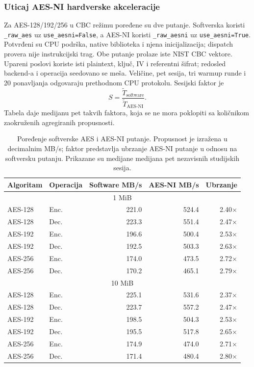 \subsubsection{Uticaj AES-NI hardverske akceleracije}
\label{sec:aesni}
\label{sec:aes-akceleracija}
\label{sec:rezultati-aesni}
Za AES-128/192/256 u CBC režimu poređene su dve putanje.
Softverska koristi \texttt{\_raw\_aes} uz \texttt{use\_\allowbreak aesni=False},
a AES-NI koristi \texttt{\_raw\_aesni} uz \texttt{use\_\allowbreak aesni=True}.
Potvrđeni su CPU podrška, native biblioteka
i njena inicijalizacija; dispatch provera nije instrukcijski trag.
Obe putanje prolaze iste NIST CBC vektore. Upareni poslovi koriste isti
plaintext, ključ, IV i referentni šifrat; redosled backend-a i operacija
seedovano se meša. Veličine, pet sesija, tri warmup runde i 20 ponavljanja
odgovaraju prethodnom CPU protokolu. Sesijski faktor je
\begin{equation}
S = \frac{\widetilde{T}_{\mathrm{software}}}
         {\widetilde{T}_{\mathrm{AES\mbox{-}NI}}}.
\label{eq:aesni-ubrzanje}
\end{equation}
Tabela daje medijanu pet takvih faktora, koja se ne mora poklopiti sa
količnikom zaokruženih agregiranih propusnosti.

\begin{table}[htbp]
\centering
\caption{Poređenje softverske AES i AES-NI putanje. Propusnost je izražena
u decimalnim MB/s; faktor predstavlja ubrzanje AES-NI putanje u odnosu na
softversku putanju. Prikazane su medijane medijana pet nezavisnih studijskih
sesija.}
\label{tab:aesni-rezultati}
\begin{tabular}{llrrr}
\toprule
Algoritam & Operacija &
Software MB/s & AES-NI MB/s & Ubrzanje \\
\midrule
\multicolumn{5}{c}{1 MiB} \\
\midrule
AES-128 & Enc. & 221.0 & 524.4 & 2.40$\times$ \\
AES-128 & Dec. & 223.3 & 551.4 & 2.47$\times$ \\
AES-192 & Enc. & 196.6 & 500.4 & 2.53$\times$ \\
AES-192 & Dec. & 192.5 & 503.3 & 2.63$\times$ \\
AES-256 & Enc. & 174.0 & 473.5 & 2.72$\times$ \\
AES-256 & Dec. & 170.2 & 465.1 & 2.79$\times$ \\
\midrule
\multicolumn{5}{c}{10 MiB} \\
\midrule
AES-128 & Enc. & 225.1 & 531.6 & 2.37$\times$ \\
AES-128 & Dec. & 223.7 & 557.2 & 2.47$\times$ \\
AES-192 & Enc. & 198.5 & 504.3 & 2.53$\times$ \\
AES-192 & Dec. & 195.5 & 517.8 & 2.65$\times$ \\
AES-256 & Enc. & 174.9 & 474.0 & 2.71$\times$ \\
AES-256 & Dec. & 171.4 & 480.4 & 2.80$\times$ \\
\bottomrule
\end{tabular}
\end{table}

